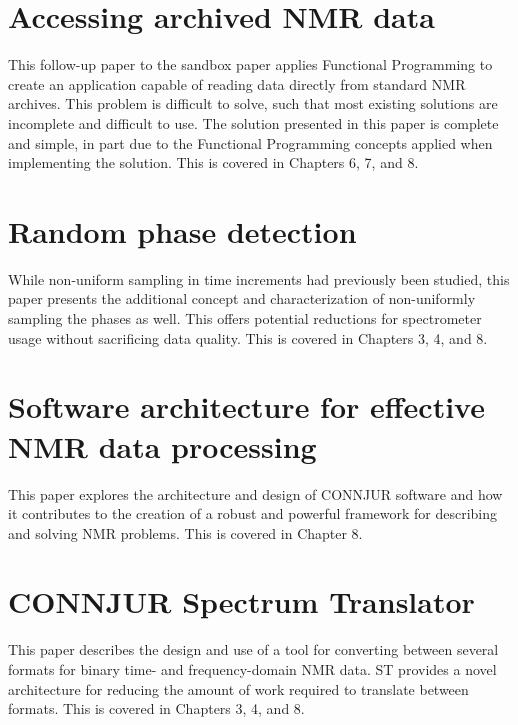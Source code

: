 \section{Accessing archived NMR data}
This follow-up paper to the sandbox paper applies Functional Programming
to create \cite{fenwick2013} an application capable of reading data directly
from standard NMR archives.  This problem is difficult to solve, such
that most existing solutions are incomplete and difficult to use.  The solution
presented in this paper is complete and simple, in part due to the 
Functional Programming concepts applied when implementing the solution.
This is covered in Chapters 6, 7, and 8.


\section{Random phase detection}
While non-uniform sampling in time increments had previously been studied,
this paper \cite{maciejewski2011random} presents the additional concept and
characterization of non-uniformly sampling the phases as well.  This offers
potential reductions for spectrometer usage without sacrificing data quality.
This is covered in Chapters 3, 4, and 8.


\section{Software architecture for effective NMR data processing}
This paper \cite{connjur_pipeline} explores the architecture and design of 
CONNJUR software and how it contributes to the creation of a robust and
powerful framework for describing and solving NMR problems.
This is covered in Chapter 8.


\section{CONNJUR Spectrum Translator}
This paper \cite{connjur-st} describes the design and use of a tool for 
converting between several formats for binary time- and frequency-domain
NMR data.  ST provides a novel architecture for 
reducing the amount of work required to translate between formats.  This is
covered in Chapters 3, 4, and 8.

